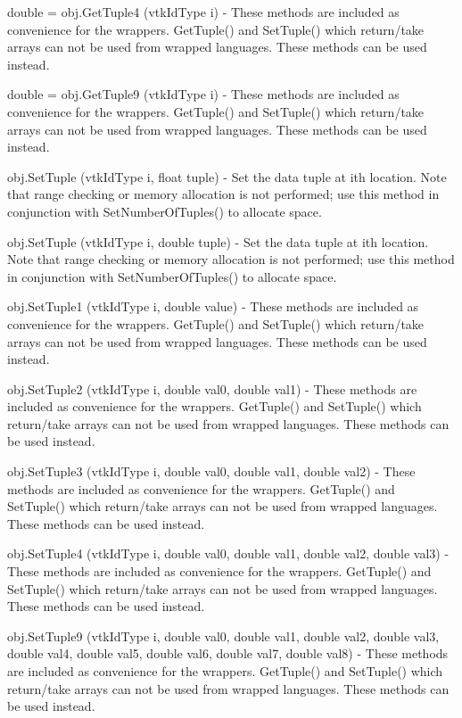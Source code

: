\begin{DoxyItemize}
\item {\ttfamily double = obj.\-Get\-Tuple4 (vtk\-Id\-Type i)} -\/ These methods are included as convenience for the wrappers. Get\-Tuple() and Set\-Tuple() which return/take arrays can not be used from wrapped languages. These methods can be used instead.  
\item {\ttfamily double = obj.\-Get\-Tuple9 (vtk\-Id\-Type i)} -\/ These methods are included as convenience for the wrappers. Get\-Tuple() and Set\-Tuple() which return/take arrays can not be used from wrapped languages. These methods can be used instead.  
\item {\ttfamily obj.\-Set\-Tuple (vtk\-Id\-Type i, float tuple)} -\/ Set the data tuple at ith location. Note that range checking or memory allocation is not performed; use this method in conjunction with Set\-Number\-Of\-Tuples() to allocate space.  
\item {\ttfamily obj.\-Set\-Tuple (vtk\-Id\-Type i, double tuple)} -\/ Set the data tuple at ith location. Note that range checking or memory allocation is not performed; use this method in conjunction with Set\-Number\-Of\-Tuples() to allocate space.  
\item {\ttfamily obj.\-Set\-Tuple1 (vtk\-Id\-Type i, double value)} -\/ These methods are included as convenience for the wrappers. Get\-Tuple() and Set\-Tuple() which return/take arrays can not be used from wrapped languages. These methods can be used instead.  
\item {\ttfamily obj.\-Set\-Tuple2 (vtk\-Id\-Type i, double val0, double val1)} -\/ These methods are included as convenience for the wrappers. Get\-Tuple() and Set\-Tuple() which return/take arrays can not be used from wrapped languages. These methods can be used instead.  
\item {\ttfamily obj.\-Set\-Tuple3 (vtk\-Id\-Type i, double val0, double val1, double val2)} -\/ These methods are included as convenience for the wrappers. Get\-Tuple() and Set\-Tuple() which return/take arrays can not be used from wrapped languages. These methods can be used instead.  
\item {\ttfamily obj.\-Set\-Tuple4 (vtk\-Id\-Type i, double val0, double val1, double val2, double val3)} -\/ These methods are included as convenience for the wrappers. Get\-Tuple() and Set\-Tuple() which return/take arrays can not be used from wrapped languages. These methods can be used instead.  
\item {\ttfamily obj.\-Set\-Tuple9 (vtk\-Id\-Type i, double val0, double val1, double val2, double val3, double val4, double val5, double val6, double val7, double val8)} -\/ These methods are included as convenience for the wrappers. Get\-Tuple() and Set\-Tuple() which return/take arrays can not be used from wrapped languages. These methods can be used instead.  

\end{DoxyItemize}
